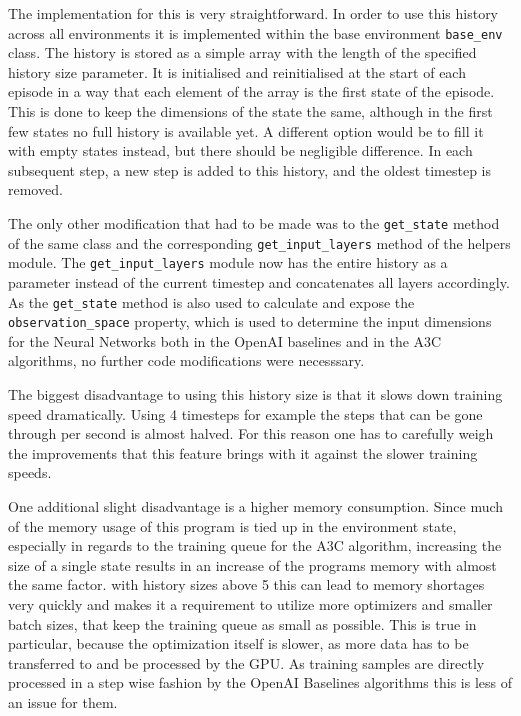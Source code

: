The implementation for this is very straightforward. In order to use this history across all environments it is implemented within the base environment \lstinline{base_env} class. The history is stored as a simple array with the length of the specified history size parameter. It is initialised and reinitialised at the start of each episode in a way that each element of the array is the first state of the episode. This is done to keep the dimensions of the state the same, although in the first few states no full history is available yet. A different option would be to fill it with empty states instead, but there should be negligible difference. In each subsequent step, a new step is added to this history, and the oldest timestep is removed. 

The only other modification that had to be made was to the \lstinline{get_state} method of the same class and the corresponding \lstinline{get_input_layers} method of the helpers module. The \lstinline{get_input_layers} module now has the entire history as a parameter instead of the current timestep and concatenates all layers accordingly. As the \lstinline{get_state} method is also used to calculate and expose the \lstinline{observation_space} property, which is used to determine the input dimensions for the Neural Networks both in the OpenAI baselines and in the A3C algorithms, no further code modifications were necesssary.  

The biggest disadvantage to using this history size is that it slows down training speed dramatically. Using 4 timesteps for example the steps that can be gone through per second is almost halved. For this reason one has to carefully weigh the improvements that this feature brings with it against the slower training speeds. 

One additional slight disadvantage is a higher memory consumption. Since much of the memory usage of this program is tied up in the environment state, especially in regards to the training queue for the A3C algorithm, increasing the size of a single state results in an increase of the programs memory with almost the same factor. with history sizes above 5 this can lead to memory shortages very quickly and makes it a requirement to utilize more optimizers and smaller batch sizes, that keep the training queue as small as possible. This is true in particular, because the optimization itself is slower, as more data has to be transferred to and be processed by the GPU. As training samples are directly processed in a step wise fashion by the OpenAI Baselines algorithms this is less of an issue for them. 

